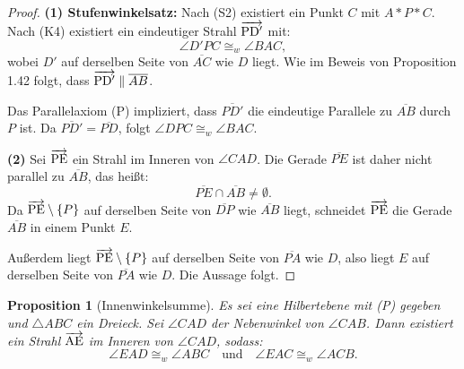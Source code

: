 \documentclass[a4paper,12pt]{article}
\theoremstyle{break}
\newtheorem{proposition}[definition]{Proposition}
\begin{document}
\begin{proof}
\textbf{(1) Stufenwinkelsatz:}  
Nach (S2) existiert ein Punkt \(C\) mit \(A * P * C\). Nach (K4) existiert ein eindeutiger Strahl \(\overrightarrow{\rm PD'}\) mit:
\[
\angle D'PC \cong_w \angle BAC,
\]
wobei \(D'\) auf derselben Seite von \(\overline{AC}\) wie \(D\) liegt. Wie im Beweis von Proposition 1.42 folgt, dass \(\overrightarrow{\rm PD'} \parallel \overline{AB}\).  

Das Parallelaxiom (P) impliziert, dass \(\overline{PD'}\) die eindeutige Parallele zu \(\overline{AB}\) durch \(P\) ist. Da \(\overline{PD'} = \overline{PD}\), folgt \(\angle DPC \cong_w \angle BAC\).  

\textbf{(2)}  
Sei \(\overrightarrow{\rm PE}\) ein Strahl im Inneren von \(\angle CAD\). Die Gerade \(\overline{PE}\) ist daher nicht parallel zu \(\overline{AB}\), das heißt:
\[
\overline{PE} \cap \overline{AB} \neq \emptyset.
\]
Da \(\overrightarrow{\rm PE} \setminus \{P\}\) auf derselben Seite von \(\overline{DP}\) wie \(\overline{AB}\) liegt, schneidet \(\overrightarrow{\rm PE}\) die Gerade \(\overline{AB}\) in einem Punkt \(E\).  

Außerdem liegt \(\overrightarrow{\rm PE} \setminus \{P\}\) auf derselben Seite von \(\overline{PA}\) wie \(D\), also liegt \(E\) auf derselben Seite von \(\overline{PA}\) wie \(D\). Die Aussage folgt.
\end{proof}

\begin{proposition}[Innenwinkelsumme]
Es sei eine Hilbertebene mit (P) gegeben und \(\triangle ABC\) ein Dreieck. Sei \(\angle CAD\) der Nebenwinkel von \(\angle CAB\). Dann existiert ein Strahl \(\overrightarrow{\rm AE}\) im Inneren von \(\angle CAD\), sodass:
\[
\angle EAD \cong_w \angle ABC \quad \text{und} \quad \angle EAC \cong_w \angle ACB.
\]
\end{proposition}
\end{document}
